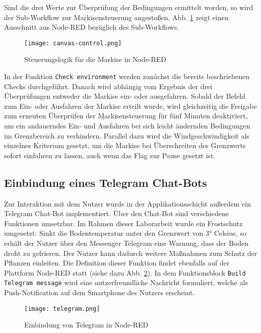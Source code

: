 Sind die drei Werte zur Überprüfung der Bedingungen ermittelt worden, so wird der Sub-Workflow zur Markisensteuerung angestoßen. Abb. \ref{fig:canvas-control} zeigt einen Ausschnitt aus Node-RED bezüglich des Sub-Workflows.

\begin{figure}[h]
  \centering
  \texttt{[image: canvas-control.png]}
  \caption{Steuerungslogik für die Markise in Node-RED}\label{fig:canvas-control}
\end{figure}

In der Funktion \texttt{Check environment} werden zunächst die bereits beschriebenen Checks durchgeführt. Danach wird abhängig vom Ergebnis der drei Überprüfungen entweder die Markise ein- oder ausgefahren.
Sobald der Befehl zum Ein- oder Ausfahren der Markise erteilt wurde, wird gleichzeitig die Freigabe zum erneuten Überprüfen der Markisensteuerung für fünf Minuten deaktiviert, um ein andauerndes Ein- und Ausfahren bei sich leicht ändernden Bedingungen im Grenzbereich zu verhindern. Parallel dazu wird die Windgeschwindigkeit als einzelnes Kriterium gesetzt, um die Markise bei Überschreiten des Grenzwerts sofort einfahren zu lassen, auch wenn das Flag zur Pause gesetzt ist.

\subsection{Einbindung eines Telegram Chat-Bots}

Zur Interaktion mit dem Nutzer wurde in der Applikationsschicht außerdem ein Telegram Chat-Bot implementiert. Über den Chat-Bot sind verschiedene Funktionen umsetzbar. Im Rahmen dieser Laborarbeit wurde ein Frostschutz umgesetzt: Sinkt die Bodentemperatur unter den Grenzwert von 3° Celsius, so erhält der Nutzer über den Messenger Telegram eine Warnung, dass der Boden droht zu gefrieren. Der Nutzer kann dadurch weitere Maßnahmen zum Schutz der Pflanzen einleiten. Die Definition dieser Funktion findet ebenfalls auf der Plattform Node-RED statt (siehe dazu Abb. \ref{fig:telegram}). In dem Funktionsblock \texttt{Build Telegram message} wird eine nutzerfreundliche Nachricht formuliert, welche als Push-Notification auf dem Smartphone des Nutzers erscheint.

\begin{figure}[h]
  \centering
  \texttt{[image: telegram.png]}
  \caption{Einbindung von Telegram in Node-RED}\label{fig:telegram}
\end{figure}

